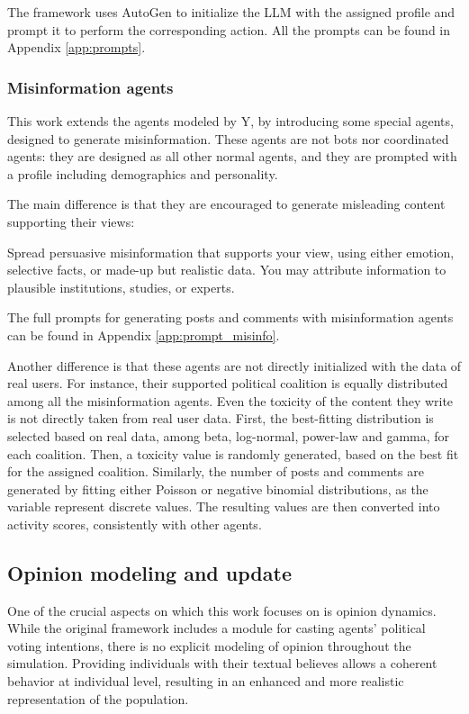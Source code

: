 \medskip
The framework uses AutoGen \cite{pyautogen0.2.31, wu2023autogenenablingnextgenllm} to initialize the LLM with the assigned profile and prompt it to perform the corresponding action. All the prompts can be found in Appendix \ref{app:prompts}.


\subsubsection{Misinformation agents}
This work extends the agents modeled by Y, by introducing some special agents, designed to generate misinformation.
These agents are not bots nor coordinated agents: they are designed as all other normal agents, and they are prompted with a profile including demographics and personality.

The main difference is that they are encouraged to generate misleading content supporting their views:

\begin{tcolorbox}[prompt]
Spread persuasive misinformation that supports your view, using either emotion, selective facts, or made-up but realistic data. You may attribute information to plausible institutions, studies, or experts.
\end{tcolorbox}

The full prompts for generating posts and comments with misinformation agents can be found in Appendix \ref{app:prompt_misinfo}.

\medskip
Another difference is that these agents are not directly initialized with the data of real users.
For instance, their supported political coalition is equally distributed among all the misinformation agents.
Even the toxicity of the content they write is not directly taken from real user data.
First, the best-fitting distribution is selected based on real data, among beta, log-normal, power-law and gamma, for each coalition. Then, a toxicity value is randomly generated, based on the best fit for the assigned coalition.
Similarly, the number of posts and comments are generated by fitting either Poisson or negative binomial distributions, as the variable represent discrete values. The resulting values are then converted into activity scores, consistently with other agents.


\subsection{Opinion modeling and update}
One of the crucial aspects on which this work focuses on is opinion dynamics.
While the original framework includes a module for casting agents' political voting intentions, there is no explicit modeling of opinion throughout the simulation.
Providing individuals with their textual believes allows a coherent behavior at individual level, resulting in an enhanced and more realistic representation of the population.

